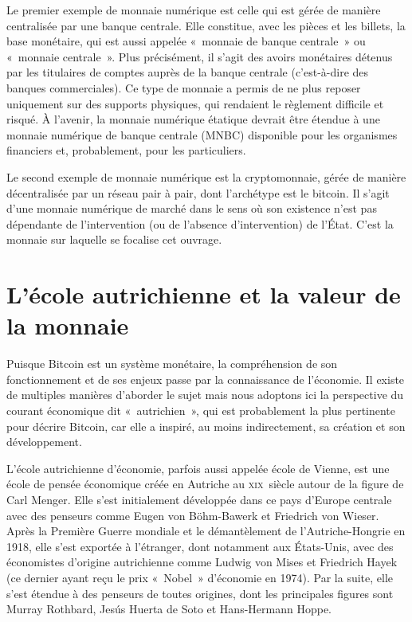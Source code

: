 Le premier exemple de monnaie numérique est celle qui est gérée de manière centralisée par une banque centrale. Elle constitue, avec les pièces et les billets, la base monétaire, qui est aussi appelée «~monnaie de banque centrale~» ou «~monnaie centrale~». Plus précisément, il s'agit des avoirs monétaires détenus par les titulaires de comptes auprès de la banque centrale (c'est-à-dire des banques commerciales). Ce type de monnaie a permis de ne plus reposer uniquement sur des supports physiques, qui rendaient le règlement difficile et risqué. À l'avenir, la monnaie numérique étatique devrait être étendue à une monnaie numérique de banque centrale (MNBC) disponible pour les organismes financiers et, probablement, pour les particuliers. %

Le second exemple de monnaie numérique est la cryptomonnaie, gérée de manière décentralisée par un réseau pair à pair, dont l'archétype est le bitcoin. Il s'agit d'une monnaie numérique de marché dans le sens où son existence n'est pas dépendante de l'intervention (ou de l'absence d'intervention) de l'État. C'est la monnaie sur laquelle se focalise cet ouvrage.

\section*{L'école autrichienne et la valeur de la monnaie}

Puisque Bitcoin est un système monétaire, la compréhension de son fonctionnement et de ses enjeux passe par la connaissance de l'économie. Il existe de multiples manières d'aborder le sujet mais nous adoptons ici la perspective du courant économique dit «~autrichien~», qui est probablement la plus pertinente pour décrire Bitcoin, car elle a inspiré, au moins indirectement, sa création et son développement.

L'école autrichienne d'économie, parfois aussi appelée école de Vienne, est une école de pensée économique créée en Autriche au \textsc{xix}\ieme{}~siècle autour de la figure de Carl Menger. Elle s'est initialement développée dans ce pays d'Europe centrale avec des penseurs comme Eugen von Böhm-Bawerk et Friedrich von Wieser. Après la Première Guerre mondiale et le démantèlement de l'Autriche-Hongrie en 1918, elle s'est exportée à l'étranger, dont notamment aux États-Unis, avec des économistes d'origine autrichienne comme Ludwig von Mises et Friedrich Hayek (ce dernier ayant reçu le prix «~Nobel~» d'économie en 1974). Par la suite, elle s'est étendue à des penseurs de toutes origines, dont les principales figures sont Murray Rothbard, Jesús Huerta de Soto et Hans-Hermann Hoppe.


